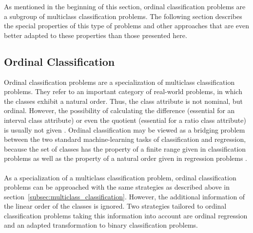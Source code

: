 \documentclass[article,type=msc,colorback,accentcolor=tud7b]{tudthesis}
\begin{document}
    As mentioned in the beginning of this section, ordinal classification problems are a subgroup of multiclass classification problems. The following section describes the special properties of this type of problems and other approaches that are even better adapted to these properties than those presented here.

  \subsection{Ordinal Classification}
  \label{subsec:ordinal_classification}
    Ordinal classification problems are a specialization of multiclass classification problems. They refer to an important category of real-world problems, in which the classes exhibit a natural order. Thus, the class attribute is not nominal, but ordinal. However, the possibility of calculating the difference (essential for an interval class attribute) or even the quotient (essential for a ratio class attribute) is usually not given \autocite[chapter~1]{Frank2001}. Ordinal classification may be viewed as a bridging problem between the two standard machine-learning tasks of classification and regression, because the set of classes has the property of a finite range given in classification problems as well as the property of a natural order given in regression problems \autocite[chapter~1]{Kotsiantis2004}. \\\\
    As a specialization of a multiclass classification problem, ordinal classification problems can be approached with the same strategies as described above in section~\ref{subsec:multiclass_classification}. However, the additional information of the linear order of the classes is ignored. Two strategies tailored to ordinal classification problems taking this information into account are ordinal regression and an adapted transformation to binary classification problems.
\end{document}

